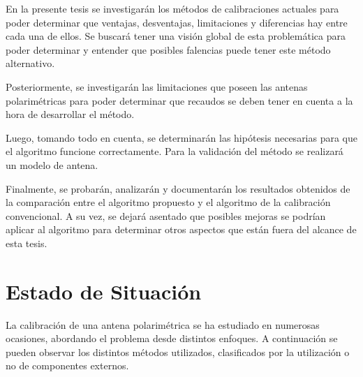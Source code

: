 \documentclass[a4paper,10pt]{article}
\begin{document}
		En la presente tesis se investigarán los métodos de calibraciones 
	actuales para poder determinar que ventajas, desventajas, limitaciones y 
	diferencias hay entre cada una de ellos. Se buscará tener una visión global
	de esta problemática para poder determinar y entender que posibles falencias
	puede tener este método alternativo.

		Posteriormente, se investigarán las limitaciones que poseen las antenas 
	polarimétricas para poder determinar que recaudos se deben tener en cuenta a
	la hora de desarrollar el método.

		Luego, tomando todo en cuenta, se determinarán las hipótesis necesarias
	para que el algoritmo funcione correctamente. Para la validación del método
	se realizará un modelo de antena.
		
		Finalmente, se probarán, analizarán y documentarán los resultados 
	obtenidos de la comparación entre el algoritmo propuesto y el algoritmo de
	la calibración convencional. A su vez, se dejará asentado que posibles 
	mejoras se podrían aplicar al algoritmo para determinar otros aspectos que
	están fuera del alcance de esta tesis.


\section{Estado de Situación}
		La calibración de una antena polarimétrica se ha estudiado en numerosas 
	ocasiones, abordando el problema desde distintos enfoques. A continuación se
    pueden observar los distintos métodos utilizados, clasificados por la 
    utilización o no de componentes externos.
\end{document}
